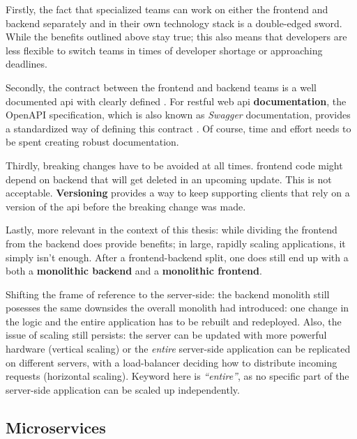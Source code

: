 Firstly, the fact that specialized teams can work on either the \gls{frontend}
and \gls{backend} separately and in their own technology stack is a double-edged
sword. While the benefits outlined above stay true; this also means that
developers are less flexible to switch teams in times of developer shortage or
approaching deadlines.

Secondly, the contract between the \gls{frontend} and \gls{backend} teams is a
well documented \gls{api} with clearly defined . For \gls{restful}
web \gls{api} \textbf{documentation}, the OpenAPI
specification, which is also known as
\textit{Swagger} documentation, provides a standardized way of defining this
contract \autocite{Koren_Klamma_2018}. Of course, time and effort needs to be
spent creating robust documentation. 

Thirdly, breaking changes have to be avoided at all times. \Gls{frontend} code
might depend on backend  that will get deleted in an
upcoming update. This is not acceptable.
\textbf{Versioning} provides a
way to keep supporting clients that rely on a version of the \gls{api} before
the breaking change was made.

Lastly, more relevant in the context of this thesis: while dividing the
\gls{frontend} from the \gls{backend} does provide benefits; in large, rapidly
scaling applications, it simply isn't enough. After a
\gls{frontend}-\gls{backend} split, one does still end up with a both a
\textbf{\gls{monolithic} \gls{backend}} and a \textbf{\gls{monolithic}
\gls{frontend}}. 

Shifting the frame of reference to the server-side: the \gls{backend}
\gls{monolith} still posesses the same downsides the overall \gls{monolith} had
introduced: one change in the logic and the entire application has to be
rebuilt and redeployed. Also, the issue of scaling still persists: the server
can be updated with more powerful hardware (vertical scaling) or the \textit{entire}
server-side application can be replicated on different servers, with a
\gls{load-balancer} deciding how to distribute incoming requests (horizontal scaling).
Keyword here is \textit{``entire''}, as no specific part of the server-side
application can be scaled up independently. 


\subsection{Microservices} 
\label{ssec:microservices}

